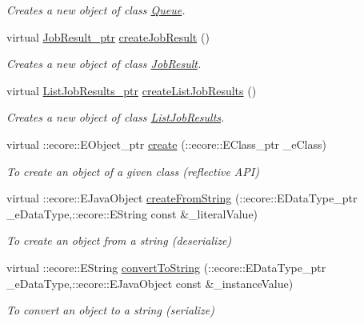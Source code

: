 \begin{DoxyCompactItemize}
\begin{DoxyCompactList}\small\item\em Creates a new object of class \hyperlink{classTMS__Data_1_1Queue}{Queue}. \item\end{DoxyCompactList}\item 
virtual \hyperlink{classTMS__Data_1_1JobResult}{JobResult\_\-ptr} \hyperlink{classTMS__Data_1_1TMS__DataFactory_a5b33680e0d96e0e27596733390917bd3}{createJobResult} ()
\begin{DoxyCompactList}\small\item\em Creates a new object of class \hyperlink{classTMS__Data_1_1JobResult}{JobResult}. \item\end{DoxyCompactList}\item 
virtual \hyperlink{classTMS__Data_1_1ListJobResults}{ListJobResults\_\-ptr} \hyperlink{classTMS__Data_1_1TMS__DataFactory_a7a04dad0e8d92bc4888a1056798f5267}{createListJobResults} ()
\begin{DoxyCompactList}\small\item\em Creates a new object of class \hyperlink{classTMS__Data_1_1ListJobResults}{ListJobResults}. \item\end{DoxyCompactList}\item 
virtual ::ecore::EObject\_\-ptr \hyperlink{classTMS__Data_1_1TMS__DataFactory_ad86139afcdb233b47d310bab488f4944}{create} (::ecore::EClass\_\-ptr \_\-eClass)
\begin{DoxyCompactList}\small\item\em To create an object of a given class (reflective API) \item\end{DoxyCompactList}\item 
virtual ::ecore::EJavaObject \hyperlink{classTMS__Data_1_1TMS__DataFactory_a5c4d6c613208f482b7d4ea75f541bf47}{createFromString} (::ecore::EDataType\_\-ptr \_\-eDataType,::ecore::EString const \&\_\-literalValue)
\begin{DoxyCompactList}\small\item\em To create an object from a string (deserialize) \item\end{DoxyCompactList}\item 
virtual ::ecore::EString \hyperlink{classTMS__Data_1_1TMS__DataFactory_acd55158f6cd0d920d80649d330fa95f6}{convertToString} (::ecore::EDataType\_\-ptr \_\-eDataType,::ecore::EJavaObject const \&\_\-instanceValue)
\begin{DoxyCompactList}\small\item\em To convert an object to a string (serialize) \item\end{DoxyCompactList}\end{DoxyCompactItemize}
